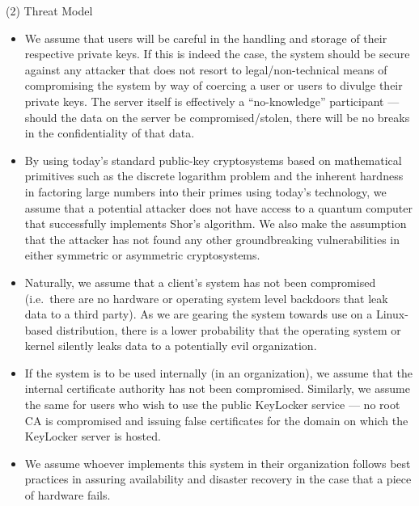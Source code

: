 \documentclass[11pt, letterpaper]{article}
\begin{document}
\noindent(2) Threat Model
\begin{itemize} \itemsep1pt \parskip0pt 
\item We assume that users will be careful in the handling and storage of their respective private keys. If this is indeed the case, the system should be secure against any attacker that does not resort to legal/non-technical means of compromising the system by way of coercing a user or users to divulge their private keys. The server itself is effectively a “no-knowledge” participant --- should the data on the server be compromised/stolen, there will be no breaks in the confidentiality of that data.
\item By using today’s standard public-key cryptosystems based on mathematical primitives such as the discrete logarithm problem and the inherent hardness in factoring large numbers into their primes using today’s technology, we assume that a potential attacker does not have access to a quantum computer that successfully implements Shor’s algorithm. We also make the assumption that the attacker has not found any other groundbreaking vulnerabilities in either symmetric or asymmetric cryptosystems.
\item Naturally, we assume that a client’s system has not been compromised (i.e.\ there are no hardware or operating system level backdoors that leak data to a third party). As we are gearing the system towards use on a Linux-based distribution, there is a lower probability that the operating system or kernel silently leaks data to a potentially evil organization.
\item If the system is to be used internally (in an organization), we assume that the internal certificate authority has not been compromised. Similarly, we assume the same for users who wish to use the public KeyLocker service --- no root \ac{CA} is compromised and issuing false certificates for the domain on which the KeyLocker server is hosted.
\item We assume whoever implements this system in their organization follows best practices in assuring availability and disaster recovery in the case that a piece of hardware fails.
\end{itemize}
\end{document}
